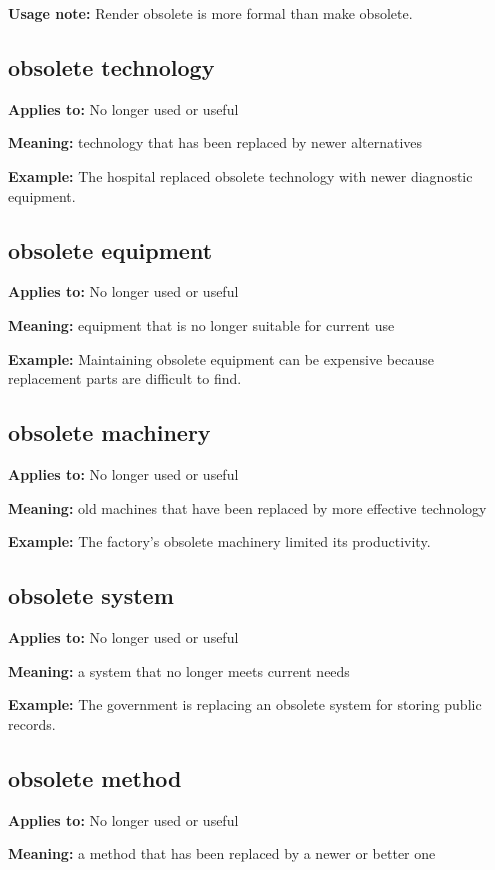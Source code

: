 \documentclass[11pt]{article}
\begin{document}
\textbf{Usage note:} Render obsolete is more formal than make obsolete.

\subsection{obsolete technology}
\textbf{Applies to:} No longer used or useful

\textbf{Meaning:} technology that has been replaced by newer alternatives

\textbf{Example:} The hospital replaced obsolete technology with newer diagnostic equipment.

\subsection{obsolete equipment}
\textbf{Applies to:} No longer used or useful

\textbf{Meaning:} equipment that is no longer suitable for current use

\textbf{Example:} Maintaining obsolete equipment can be expensive because replacement parts are difficult to find.

\subsection{obsolete machinery}
\textbf{Applies to:} No longer used or useful

\textbf{Meaning:} old machines that have been replaced by more effective technology

\textbf{Example:} The factory's obsolete machinery limited its productivity.

\subsection{obsolete system}
\textbf{Applies to:} No longer used or useful

\textbf{Meaning:} a system that no longer meets current needs

\textbf{Example:} The government is replacing an obsolete system for storing public records.

\subsection{obsolete method}
\textbf{Applies to:} No longer used or useful

\textbf{Meaning:} a method that has been replaced by a newer or better one
\end{document}
